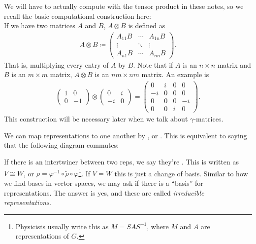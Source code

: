\documentclass[11pt]{article}
\begin{document}
\begin{nnote}
    We will have to actually compute with the tensor product in these
    notes, so we recall the basic computational construction here:\\

    \noin
    If we have two matrices $A$ and $B$, $A \otimes B$
    is defined as
    \begin{align*}
        A \otimes B \coloneqq \begin{pmatrix}
            A_{11} B & \cdots & A_{1n} B\\
            \vdots & \ddots & \vdots\\
            A_{n1} B & \cdots & A_{nn} B
        \end{pmatrix}.
    \end{align*}
    That is, multiplying every entry of $A$ by $B$.
    Note that if $A$ is an $n \times n$ matrix and
    $B$ is an $m \times m$ matrix, $A \otimes B$
    is an $nm \times nm$ matrix.
    An example is
    \begin{align*}
        \begin{pmatrix}
            1 & 0\\
            0 & -1
        \end{pmatrix}
        \otimes
        \begin{pmatrix}
            0 & i\\
            -i & 0
        \end{pmatrix}
        = \begin{pmatrix}
            0 & i & 0 & 0\\
            -i & 0 & 0 & 0\\
            0 & 0 & 0 & -i\\
            0 & 0 & i & 0
        \end{pmatrix}.
    \end{align*}
    This construction will be necessary later when we talk about
    $\gamma$-matrices.
\end{nnote}

We can map representations to one another by , or . This is equivalent to
saying that the following diagram commutes:
\begin{center}
\end{center}
If there is an intertwiner between two reps, we say they're 
. This is written as $V \cong W$, or 
$\rho = \varphi^{-1} \circ \widetilde{\rho} \circ \varphi$\footnote{Physicists
usually write this as $M = S A S^{-1}$, where $M$ and $A$ are representations
of $G$.}. If $V = W$ this is just a change of basis. Similar to how we find bases 
in vector spaces, we may ask if there is a ``basis'' for representations. The 
answer is yes, and these are called \emph{irreducible representations}.
\end{document}
